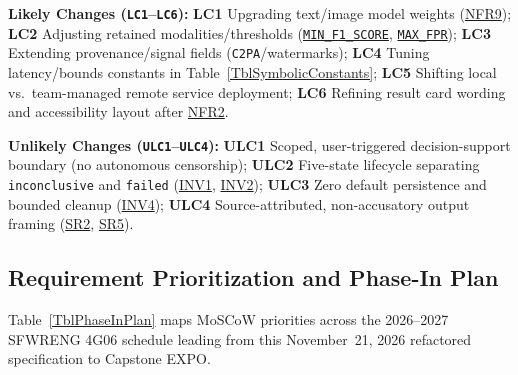 \documentclass[11pt]{article}
\newcommand{\MinFOneScore}{\hyperref[const:MIN_F1_SCORE]{\texttt{MIN\_\allowbreak{}F1\_\allowbreak{}SCORE}}}
\newcommand{\MaxFPR}{\hyperref[const:MAX_FPR]{\texttt{MAX\_\allowbreak{}FPR}}}
\begin{document}
\noindent\textbf{Likely Changes (\texttt{LC1}--\texttt{LC6}):} \label{LC1}\textbf{LC1} Upgrading text/image model weights (\hyperref[NFR9]{NFR9}); \label{LC2}\textbf{LC2} Adjusting retained modalities/thresholds (\MinFOneScore{}, \MaxFPR{}); \label{LC3}\textbf{LC3} Extending provenance/signal fields (\texttt{C2PA}/watermarks); \label{LC4}\textbf{LC4} Tuning latency/bounds constants in Table~\ref{TblSymbolicConstants}; \label{LC5}\textbf{LC5} Shifting local vs.\ team-managed remote service deployment; \label{LC6}\textbf{LC6} Refining result card wording and accessibility layout after \hyperref[NFR2]{NFR2}.

\noindent\textbf{Unlikely Changes (\texttt{ULC1}--\texttt{ULC4}):} \label{ULC1}\textbf{ULC1} Scoped, user-triggered decision-support boundary (no autonomous censorship); \label{ULC2}\textbf{ULC2} Five-state lifecycle separating \texttt{inconclusive} and \texttt{failed} (\hyperref[INV1]{INV1}, \hyperref[INV2]{INV2}); \label{ULC3}\textbf{ULC3} Zero default persistence and bounded cleanup (\hyperref[INV4]{INV4}); \label{ULC4}\textbf{ULC4} Source-attributed, non-accusatory output framing (\hyperref[SR2]{SR2}, \hyperref[SR5]{SR5}).

\subsection{Requirement Prioritization and Phase-In Plan}\label{subsec:phase-in}

Table~\ref{TblPhaseInPlan} maps MoSCoW priorities across the 2026--2027 SFWRENG 4G06 schedule leading from this November~21, 2026 refactored specification to Capstone EXPO.
\end{document}
